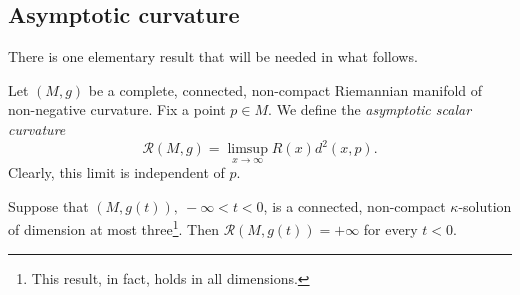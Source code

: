 \subsection{Asymptotic curvature}

There is one elementary result that will be needed in what follows.

\begin{definition}\label{def:asymptotic-scalar-curvature}
Let $(M,g)$ be a complete, connected, non-compact Riemannian manifold of
non-negative curvature. Fix a point $p\in M$. We define the {\em asymptotic
scalar curvature}
$${\mathcal R}(M,g)=\limsup_{x\rightarrow\infty}R(x)d^2(x,p).$$ Clearly, this limit is
independent of $p$.
\end{definition}

\begin{proposition}\label{prop:asymptotic-scalar-curvature-infinite}
\label{asympscal}
Suppose that $(M,g(t)),\ -\infty<t<0$, is a connected, non-compact
$\kappa$-solution of dimension at most three\footnote{This result, in fact,
holds in all dimensions.}.  Then ${\mathcal R}(M,g(t))=+\infty$ for every
$t<0$.
\end{proposition}


